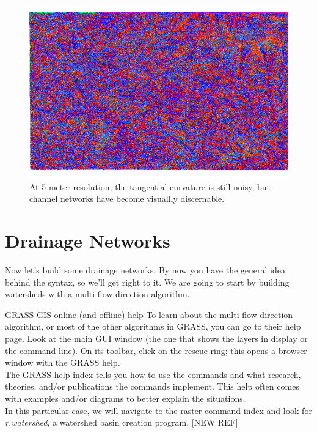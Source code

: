 \documentclass{book}
\begin{document}
\begin{figure}[h]
 \begin{center}
 \includegraphics[width=.9\linewidth]{figures/ubuntu/tcurv5m.png}
 \caption{At 5 meter resolution, the tangential curvature is still noisy, but channel networks have become visuallly discernable.}
 \label{fig:tcurv5m}
 \end{center}
\end{figure}


\section{Drainage Networks \label{s:drainage_networks}}

Now let's build some drainage networks. By now you have the general idea behind the syntax, so we'll get right to it. We are going to start by building watersheds with a multi-flow-direction algorithm.

\begin{boxx}[!ht]
\begin{bclogo}[arrondi = 0.1, logo = \bcrosevents]{GRASS GIS online (and offline) help}
To learn about the multi-flow-direction algorithm, or most of the other algorithms in GRASS, you can go to their help page. Look at the main GUI window (the one that shows the layers in display or the command line). On its toolbar, click on the rescue ring; this opens a browser window with the GRASS help. \\

The GRASS help index tells you how to use the commands and what research, theories, and/or publications the commands implement. This help often comes with examples and/or diagrams to better explain the situations. \\

In this particular case, we will navigate to the raster command index and look for \emph{r.watershed}, a watershed basin creation program. [NEW REF]
\end{bclogo}
\caption{GRASS GIS online (and offline) help}
\end{boxx}
\end{document}
